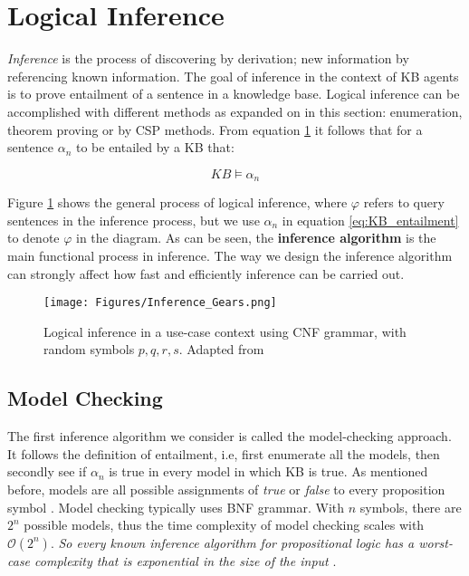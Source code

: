 


\section{Logical Inference}
\label{sec:logical_inference}
\textit{Inference} is the process of discovering by derivation; new information by referencing known information. The goal of inference in the context of KB agents is to prove entailment of a sentence in a knowledge base. Logical inference can be accomplished with different methods as expanded on in this section: enumeration, theorem proving or by CSP methods. From equation \ref{fig:entailment} it follows that for a sentence $\alpha_n$ to be entailed by a KB that:

\begin{equation}
	KB \models \alpha_n
	\label{eq:KB_entailment}
\end{equation}

Figure \ref{fig:entailment} shows the general process of logical inference, where $\varphi$ refers to query sentences in the inference process, but we use $\alpha_n$ in equation \ref{eq:KB_entailment} to denote $\varphi$ in the diagram. As can be seen, the \textbf{inference algorithm} is the main functional process in inference. The way we design the inference algorithm can strongly affect how fast and efficiently inference can be carried out. 

\begin{figure}[H]
    \centering
    \texttt{[image: Figures/Inference\_Gears.png]}
    \caption{Logical inference in a use-case context using CNF grammar, with random symbols $p,q,r,s$. Adapted from \cite{10.1007/978-3-030-21077-9_32}}
    \label{fig:entailment}
\end{figure}




\subsection{Model Checking}
\label{subsubsec: Inference_model_checking}

The first inference algorithm we consider is called the model-checking approach. It follows the definition of entailment, i.e, first enumerate all the models, then secondly see if $\alpha_n$ is true in every model in which KB is true. As mentioned before, models are all possible assignments of \textit{true} or \textit{false} to every proposition symbol \citep{russell2016artificial}. Model checking typically uses BNF grammar. With $n$ symbols, there are $2^n$ possible models, thus the time complexity of model checking scales with $\mathcal{O}(2^n)$. \textit{So every known inference algorithm for propositional logic has a worst-case complexity that is exponential in the size of the input} \citep{russell2016artificial}.\\


